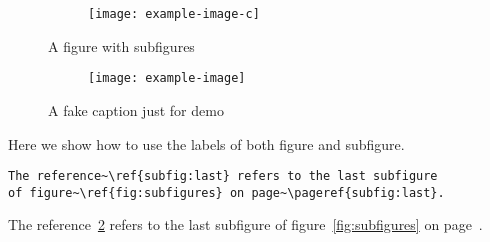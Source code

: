 \documentclass{article}
\begin{document}
\begin{figure}[!htbp]\ContinuedFloat
  \begin{subfigure}{\textwidth}
    \centering
    \texttt{[image: example-image-c]}
  \end{subfigure}
  \caption[]{A figure with subfigures}
\end{figure}

\begin{figure}[!htbp]\ContinuedFloat
  \begin{subfigure}{\textwidth}
    \centering 
    \texttt{[image: example-image]}
    \label{subfig:last}
  \end{subfigure}
  \caption[]{A fake caption just for demo}
\end{figure}

Here we show how to use the labels of both figure and subfigure.
\begin{verbatim}
The reference~\ref{subfig:last} refers to the last subfigure
of figure~\ref{fig:subfigures} on page~\pageref{subfig:last}.
\end{verbatim}

The reference~\ref{subfig:last} refers to the last subfigure
of figure~\ref{fig:subfigures} on page~\pageref{subfig:last}.
\end{document}
